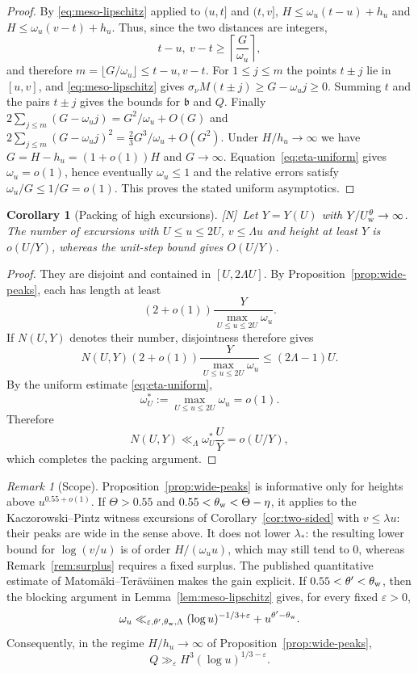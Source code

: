 \documentclass[11pt]{amsart}
\numberwithin{equation}{section}
\theoremstyle{plain}
\newtheorem{corollary}[theorem]{Corollary}
\theoremstyle{definition}
\theoremstyle{remark}
\newtheorem{remark}[theorem]{Remark}
\newcommand{\tagN}{\textup{[N]}}
\begin{document}
\begin{proof}
By \eqref{eq:meso-lipschitz} applied to $(u,t]$ and $(t,v]$,
$H\le\omega_u(t-u)+h_u$ and $H\le\omega_u(v-t)+h_u$.  Thus, since the two
distances are integers,
\[
 t-u,\ v-t\ge\left\lceil\frac{G}{\omega_u}\right\rceil,
\]
and therefore $m=\lfloor G/\omega_u\rfloor\le t-u,v-t$.  For
$1\le j\le m$ the points $t\pm j$ lie in $[u,v]$, and \eqref{eq:meso-lipschitz} gives
$\sigma_\nu M(t\pm j)\ge G-\omega_uj\ge0$. Summing $t$ and the pairs $t\pm j$
gives the bounds for $\mathfrak b$ and $Q$. Finally
$2\sum_{j\le m}(G-\omega_uj)=G^2/\omega_u+O(G)$ and
$2\sum_{j\le m}(G-\omega_uj)^2=\frac23G^3/\omega_u+O(G^2)$. Under
$H/h_u\to\infty$ we have $G=H-h_u=(1+o(1))H$ and $G\to\infty$.
Equation~\eqref{eq:eta-uniform} gives $\omega_u=o(1)$, hence eventually
$\omega_u\le1$ and the relative errors satisfy $\omega_u/G\le1/G=o(1)$.
This proves the stated uniform asymptotics.
\end{proof}

\begin{corollary}[Packing of high excursions]
\label{cor:packing}
\tagN\ Let $Y=Y(U)$ with $Y/U^\theta_{\rm w}\to\infty$. The number of excursions with
$U\le u\le2U$, $v\le\Lambda u$ and height at least $Y$ is
$o(U/Y)$, whereas the unit-step bound gives $O(U/Y)$.
\end{corollary}

\begin{proof}
They are disjoint and contained in $[U,2\Lambda U]$. By
Proposition~\ref{prop:wide-peaks}, each has length at least
\[
 (2+o(1))\frac{Y}{\max_{U\le u\le2U}\omega_u}.
\]
If $N(U,Y)$ denotes their number, disjointness therefore gives
\[
 N(U,Y)(2+o(1))\frac{Y}{\max_{U\le u\le2U}\omega_u}
 \le (2\Lambda-1)U.
\]
By the uniform estimate \eqref{eq:eta-uniform},
\[
\omega_U^*:=\max_{U\le u\le2U}\omega_u=o(1).
\]
Therefore
\[
N(U,Y)\ll_\Lambda \omega_U^*\frac{U}{Y}=o(U/Y),
\]
which completes the packing argument.
\end{proof}

\begin{remark}[Scope]
\label{rem:wide-peaks-scope}
Proposition~\ref{prop:wide-peaks} is informative only for heights above
$u^{0.55+o(1)}$. If $\Theta>0.55$ and $0.55<\theta_{\rm w}<\Theta-\eta$, it
applies to the Kaczorowski--Pintz witness excursions of
Corollary~\ref{cor:two-sided} with $v\le\lambda u$: their peaks are wide in
the sense above. It does not lower $\lambda_*$: the resulting lower bound
for $\log(v/u)$ is of order $H/(\omega_uu)$, which may still tend to $0$,
whereas Remark~\ref{rem:surplus} requires a fixed surplus. The published
quantitative estimate of Matom\"aki--Ter\"av\"ainen
\cite[Theorem~1.1]{MatomakiTeravainen2023} makes the gain explicit. If
$0.55<\theta'<\theta_{\rm w}$, then the blocking argument in
Lemma~\ref{lem:meso-lipschitz} gives, for every fixed $\varepsilon>0$,
\[
\omega_u\ll_{\varepsilon,\theta',\theta_{\rm w},\Lambda}
(\log u)^{-1/3+\varepsilon}+u^{\theta'-\theta_{\rm w}}.
\]
Consequently, in the regime $H/h_u\to\infty$ of
Proposition~\ref{prop:wide-peaks},
\[
Q\gg_{\varepsilon}H^3(\log u)^{1/3-\varepsilon}.
\]
\end{remark}
\end{document}
